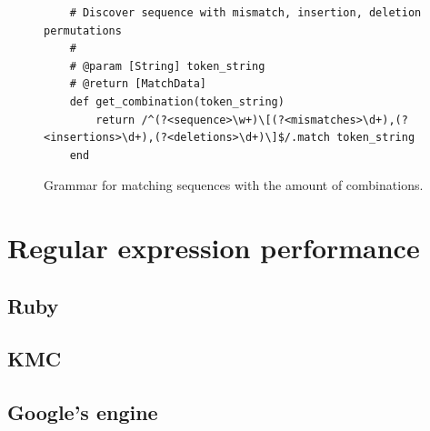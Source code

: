 \documentclass[12pt]{article}
\begin{document}
\begin{figure}[H]
	\begin{lstlisting}
 	# Discover sequence with mismatch, insertion, deletion permutations
    #
    # @param [String] token_string
    # @return [MatchData]
    def get_combination(token_string)
        return /^(?<sequence>\w+)\[(?<mismatches>\d+),(?<insertions>\d+),(?<deletions>\d+)\]$/.match token_string
    end
	\end{lstlisting}
	\caption{Grammar for matching sequences with the amount of combinations.}
	\label{fig:gamme_c}
\end{figure}

\newpage

\section{Regular expression performance}

\subsection{Ruby}

\subsection{KMC}

\subsection{Google's engine}

\newpage



\end{document}
